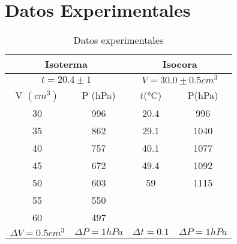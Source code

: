 \documentclass[a4paper,12pt]{article}
\begin{document}
\section{Datos Experimentales}
\begin{table}[H]
\centering
  \caption{Datos experimentales}
  \begin{tabular}{|cc|cc|}
    \hline
    \multicolumn{2}{|c|}{Isoterma}                                    & \multicolumn{2}{c|}{Isocora}                                \\ \hline
    \multicolumn{2}{|c|}{$t = 20.4\pm 1$}                             & \multicolumn{2}{c|}{$V = 30.0 \pm 0.5  cm^3$}               \\ \hline
    \multicolumn{1}{|c|}{V $(cm^3)$}             & P (hPa)            & \multicolumn{1}{c|}{$t$(°C)}           & P(hPa)             \\ \hline
    \multicolumn{1}{|c|}{30}                     & 996                & \multicolumn{1}{c|}{20.4}              & 996                \\ \hline
    \multicolumn{1}{|c|}{35}                     & 862                & \multicolumn{1}{c|}{29.1}              & 1040               \\ \hline
    \multicolumn{1}{|c|}{40}                     & 757                & \multicolumn{1}{c|}{40.1}              & 1077               \\ \hline
    \multicolumn{1}{|c|}{45}                     & 672                & \multicolumn{1}{c|}{49.4}              & 1092               \\ \hline
    \multicolumn{1}{|c|}{50}                     & 603                & \multicolumn{1}{c|}{59}                & 1115               \\ \hline
    \multicolumn{1}{|c|}{55}                     & 550                & \multicolumn{1}{c|}{}                  &                    \\ \hline
    \multicolumn{1}{|c|}{60}                     & 497                & \multicolumn{1}{c|}{}                  &                    \\ \hline
    \multicolumn{1}{|c|}{$\Delta V = 0.5 cm^3 $} & $\Delta P = 1 hPa$ & \multicolumn{1}{c|}{$\Delta t =  0.1$} & $\Delta P = 1 hPa$ \\ \hline
  \end{tabular}
\end{table}
\end{document}
